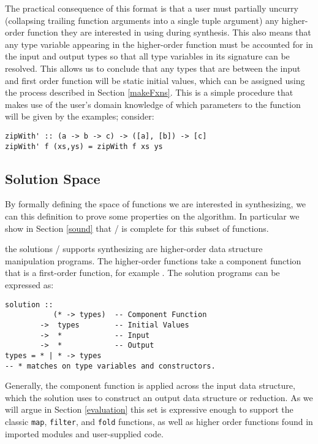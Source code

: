 The practical consequence of this format is that a user must partially uncurry (collapsing trailing function arguments into a single tuple argument) any higher-order function they are interested in using during synthesis.
This also means that any type variable appearing in the higher-order function must be accounted for in the input and output types so that all type variables in its signature can be resolved.
This allows us to conclude that any types that are between the input and first order function will be static initial values, which can be assigned using the process described in Section \ref{makeFxns}.
This is a simple procedure that makes use of the user's domain knowledge of which parameters to the function will be given by the examples; consider:

\begin{lstlisting}
zipWith' :: (a -> b -> c) -> ([a], [b]) -> [c]
zipWith' f (xs,ys) = zipWith f xs ys
\end{lstlisting}

\subsection{Solution Space}\label{solnSpace}
By formally defining the space of functions we are interested in synthesizing, we can this definition to prove some properties on the algorithm.
In particular we show in Section \ref{sound} that \ourTool/ is complete for this subset of functions.

the solutions \ourTool/ supports synthesizing are higher-order data structure manipulation programs.
The higher-order functions take a component function that is a first-order function, for example \codeinline{(+)}.
The solution programs can be expressed as:

\begin{lstlisting}
solution ::
           (* -> types)  -- Component Function
        ->  types        -- Initial Values
        ->  *            -- Input
        ->  *            -- Output
types = * | * -> types
-- * matches on type variables and constructors.
\end{lstlisting}

Generally, the component function is applied across the \textsf{input} data structure, which the \textsf{solution} uses to construct an \textsf{output} data structure or reduction. As we will argue in Section \ref{evaluation} this set is expressive enough to support the classic \texttt{map}, \texttt{filter}, and \texttt{fold} functions, as well as higher order functions found in imported modules and user-supplied code.

